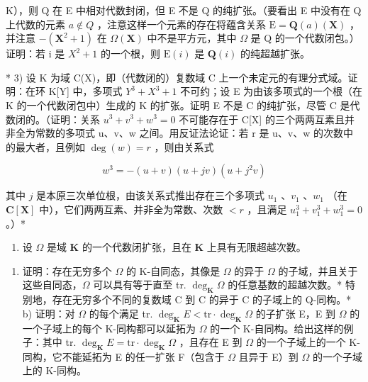 K），则 Q 在 E 中相对代数封闭，但 E 不是 Q 的纯扩张。（要看出 E 中没有在 Q 上代数的元素 \(a \notin Q\) ，注意这样一个元素的存在将蕴含关系 \(\mathrm{E} = \mathbf{Q}(a)(\mathbf{X})\) ，并注意 \(-(\mathbf{X}^{2} + 1)\) 在 \(\Omega(\mathbf{X})\) 中不是平方元，其中 \(\Omega\) 是 Q 的一个代数闭包。）证明：若 i 是 \(X^{2} + 1\) 的一个根，则 \(\mathrm{E}(i)\) 是 \(\mathbf{Q}(i)\) 的纯超越扩张。

* 3) 设 K 为域 C(X)，即（代数闭的）复数域 C 上一个未定元的有理分式域。证明：在环 K{[}Y{]} 中，多项式 \(Y^{3} + X^{3} + 1\) 不可约；设 E 为由该多项式的一个根（在 K 的一个代数闭包中）生成的 K 的扩张。证明 E 不是 C 的纯扩张，尽管 C 是代数闭的。（证明：关系 \(u^{3} + v^{3} + w^{3} = 0\) 不可能存在于 C{[}X{]} 的三个两两互素且并非全为常数的多项式 u、v、w 之间。用反证法论证：若 r 是 u、v、w 的次数中的最大者，且例如 \(\deg(w) = r\) ，则由关系式

\[
w ^ {3} = - (u + v) (u + j v) (u + j ^ {2} v)
\]

其中 \(j\) 是本原三次单位根，由该关系式推出存在三个多项式 \(u_1\) 、\(v_1\) 、\(w_1\) （在 \(\mathbf{C}[\mathbf{X}]\) 中），它们两两互素、并非全为常数、次数 \(< r\) ，且满足 \(u_1^3 + v_1^3 + w_1^3 = 0\) 。）*

\begin{enumerate}
\def\labelenumi{\arabic{enumi})}
\setcounter{enumi}{3}
\tightlist
\item
  设 \(\Omega\) 是域 \(\mathbf{K}\) 的一个代数闭扩张，且在 \(\mathbf{K}\) 上具有无限超越次数。
\end{enumerate}

\begin{enumerate}
\def\labelenumi{\alph{enumi})}
\tightlist
\item
  证明：存在无穷多个 \(\Omega\) 的 K-自同态，其像是 \(\Omega\) 的异于 \(\Omega\) 的子域，并且关于这些自同态，\(\Omega\) 可以具有等于直至 tr. \(\deg_{\mathbf{K}}\Omega\) 的任意基数的超越次数。* 特别地，存在无穷多个不同的复数域 C 到 C 的异于 C 的子域上的 Q-同构。* b) 证明：对 \(\Omega\) 的每个满足 tr. \(\deg_{\mathbf{K}}E < \text{tr} \cdot \deg_{\mathbf{K}}\Omega\) 的子扩张 E，E 到 \(\Omega\) 的一个子域上的每个 K-同构都可以延拓为 \(\Omega\) 的一个 K-自同构。给出这样的例子：其中 tr. \(\deg_{\mathbf{K}}E = \text{tr} \cdot \deg_{\mathbf{K}}\Omega\) ，且存在 E 到 \(\Omega\) 的一个子域上的一个 K-同构，它不能延拓为 E 的任一扩张 F（包含于 \(\Omega\) 且异于 E）到 \(\Omega\) 的一个子域上的 K-同构。
\end{enumerate}

